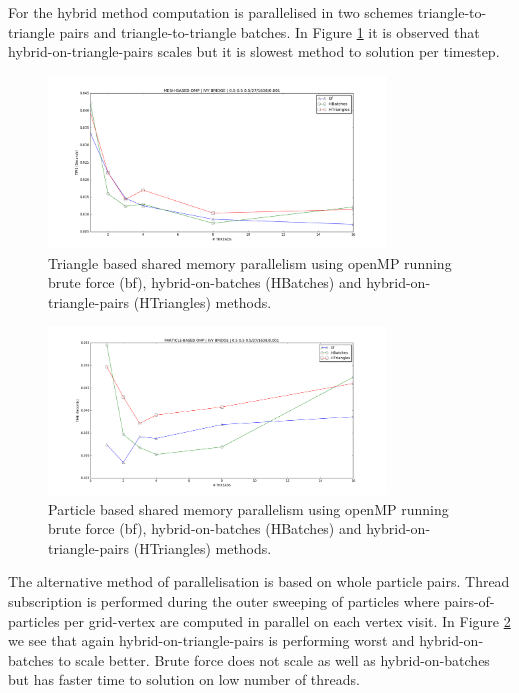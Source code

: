 For the hybrid method computation is parallelised in two schemes triangle-to-triangle pairs and triangle-to-triangle batches. 
In Figure \ref{figure:triangle_omp} it is observed that hybrid-on-triangle-pairs scales but it is slowest method to solution per timestep. 

\begin{figure}[htb]
  \begin{center}
    \includegraphics[width=0.8\textwidth]{experiments/random/omp/triangle_based_x0.png}
  \end{center}
  \caption{Triangle based shared memory parallelism using openMP running brute force (bf), hybrid-on-batches (HBatches) and hybrid-on-triangle-pairs (HTriangles) methods.}
  \label{figure:triangle_omp}
\end{figure}

\begin{figure}[htb]
  \begin{center}
    \includegraphics[width=0.8\textwidth]{experiments/random/omp/particle_based_x0.png}
  \end{center}
  \caption{Particle based shared memory parallelism using openMP running brute force (bf), hybrid-on-batches (HBatches) and hybrid-on-triangle-pairs (HTriangles) methods.}
  \label{figure:particle_omp}
\end{figure}

The alternative method of parallelisation is based on whole particle pairs. Thread subscription is performed during the outer sweeping of particles where pairs-of-particles per grid-vertex are computed in parallel on each vertex visit. In Figure \ref{figure:particle_omp} we see that again hybrid-on-triangle-pairs is performing worst and hybrid-on-batches to scale better. Brute force does not scale as well as hybrid-on-batches but has faster time to solution on low number of threads.

